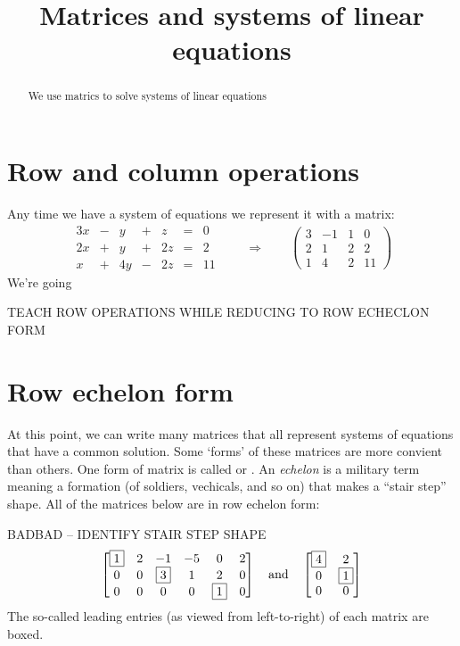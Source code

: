 \documentclass{ximera}
\title{Matrices and systems of linear equations}
\begin{document}
\begin{abstract}
  We use matrics to solve systems of linear equations
\end{abstract}
\maketitle

\section{Row and column operations}


Any time we have a system of equations we represent it with a matrix:
\[
\begin{array}{ccccccc}
      3x & -&y&+&z&= &0 \\
     2x& +&y&+&2z&=&2\\
     x& +&4y&-&2z&=&11
\end{array}
\qquad\Rightarrow\qquad
\left(\begin{array}{ccc|c}
  3 & -1 & 1 & 0 \\
  2 &  1 & 2 & 2 \\
  1 &  4 & 2 & 11 
\end{array}\right)
\]
We're going 

TEACH ROW OPERATIONS WHILE REDUCING TO ROW ECHECLON FORM



\section{Row echelon form}

At this point, we can write many matrices that all represent systems
of equations that have a common solution. Some `forms' of these
matrices are more convient than others. One form of matrix is called
 or . An \textit{echelon}
is a military term meaning a formation (of soldiers, vechicals, and so
on) that makes a ``stair step'' shape. All of the matrices below are
in row echelon form:
BADBAD -- IDENTIFY STAIR STEP SHAPE
\[
\begin{bmatrix}
 \fbox{1}&2&-1&-5&0&2\\0&0&\fbox{3}&1&2&0\\0&0&0&0&\fbox{1}&0
\end{bmatrix}
\quad
\text{and}
\quad\begin{bmatrix}
 \fbox{4}&2\\0&\fbox{1}\\0&0
\end{bmatrix}
\]
The so-called leading entries (as viewed from left-to-right) of each
matrix are boxed.
\end{document}
